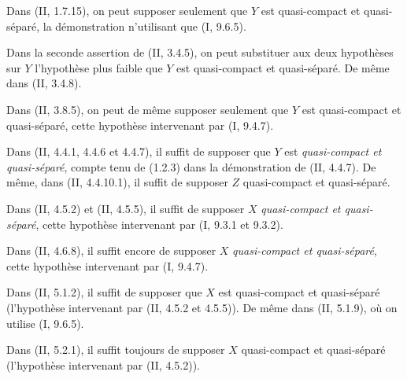 \begin{env}[1.7.10]
\label{IV.1.7.10-fr}
Dans (II, 1.7.15), on peut supposer seulement que $Y$ est quasi-compact et
quasi-séparé, la démonstration n'utilisant que (I, 9.6.5).
\end{env}

\begin{env}[1.7.11]
\label{IV.1.7.11-fr}
Dans la seconde assertion de (II, 3.4.5), on peut substituer aux deux
hypothèses sur $Y$ l'hypothèse plus faible que $Y$ est quasi-compact et
quasi-séparé. De même dans (II, 3.4.8).
\end{env}

\begin{env}[1.7.12]
\label{IV.1.7.12-fr}
Dans (II, 3.8.5), on peut de même supposer seulement que $Y$ est quasi-compact
et quasi-séparé, cette hypothèse intervenant par (I, 9.4.7).
\end{env}

\begin{env}[1.7.13]
\label{IV.1.7.13-fr}
Dans (II, 4.4.1, 4.4.6 et 4.4.7), il suffit de supposer que $Y$ est
\emph{quasi-compact et quasi-séparé}, compte tenu de (1.2.3) dans la
démonstration de (II, 4.4.7). De même, dans (II, 4.4.10.1), il suffit de
supposer $Z$ quasi-compact et quasi-séparé.
\end{env}

\begin{env}[1.7.14]
\label{IV.1.7.14-fr}
Dans (II, 4.5.2) et (II, 4.5.5), il suffit de supposer $X$
\emph{quasi-compact et quasi-séparé}, cette hypothèse intervenant par (I,
9.3.1 et 9.3.2).
\end{env}

\begin{env}[1.7.15]
\label{IV.1.7.15-fr}
Dans (II, 4.6.8), il suffit encore de supposer $X$ \emph{quasi-compact et
quasi-séparé}, cette hypothèse intervenant par (I, 9.4.7).
\end{env}

\begin{env}[1.7.16]
\label{IV.1.7.16-fr}
Dans (II, 5.1.2), il suffit de supposer que $X$ est quasi-compact et
quasi-séparé (l'hypothèse intervenant par (II, 4.5.2 et 4.5.5)). De même dans
(II, 5.1.9), où on utilise (I, 9.6.5).
\end{env}

\begin{env}[1.7.17]
\label{IV.1.7.17-fr}
Dans (II, 5.2.1), il suffit toujours de supposer $X$ quasi-compact et
quasi-séparé (l'hypothèse intervenant par (II, 4.5.2)).
\end{env}

